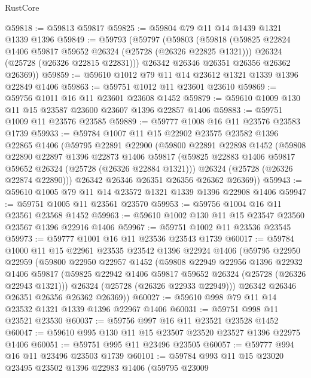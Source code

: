 \begin{lexlean}{RustCore}
\begin{coremodule}
@59818 := @59813 @59817
@59825 := @59804 @79 @11 @14 @1439 @1321 @1339 @1396
@59849 := @59793
    (@59797
      (@59803
        (@59818
          (@59825 @22824 @1406 @59817 @59652 @26324 (@25728 (@26326 @22825 @1321)))
          @26324
          (@25728 (@26326 @22815 @22831)))
        @26342
        @26346
        @26351
        @26356
        @26362
        @26369))
@59859 := @59610 @1012 @79 @11 @14 @23612 @1321 @1339 @1396 @22849 @1406
@59863 := @59751 @1012 @11 @23601 @23610
@59869 := @59756 @1011 @16 @11 @23601 @23608 @1452
@59879 := @59610 @1009 @130 @11 @15 @23587 @23600 @23607 @1396 @22857 @1406
@59883 := @59751 @1009 @11 @23576 @23585
@59889 := @59777 @1008 @16 @11 @23576 @23583 @1739
@59933 := @59784
    @1007
    @11
    @15
    @22902
    @23575
    @23582
    @1396
    @22865
    @1406
    (@59795
      @22891
      @22900
      (@59800
        @22891
        @22898
        @1452
        (@59808
          @22890
          @22897
          @1396
          @22873
          @1406
          @59817
          (@59825 @22883 @1406 @59817 @59652 @26324 (@25728 (@26326 @22884 @1321)))
          @26324
          (@25728 (@26326 @22874 @22890)))
        @26342
        @26346
        @26351
        @26356
        @26362
        @26369))
@59943 := @59610 @1005 @79 @11 @14 @23572 @1321 @1339 @1396 @22908 @1406
@59947 := @59751 @1005 @11 @23561 @23570
@59953 := @59756 @1004 @16 @11 @23561 @23568 @1452
@59963 := @59610 @1002 @130 @11 @15 @23547 @23560 @23567 @1396 @22916 @1406
@59967 := @59751 @1002 @11 @23536 @23545
@59973 := @59777 @1001 @16 @11 @23536 @23543 @1739
@60017 := @59784
    @1000
    @11
    @15
    @22961
    @23535
    @23542
    @1396
    @22924
    @1406
    (@59795
      @22950
      @22959
      (@59800
        @22950
        @22957
        @1452
        (@59808
          @22949
          @22956
          @1396
          @22932
          @1406
          @59817
          (@59825 @22942 @1406 @59817 @59652 @26324 (@25728 (@26326 @22943 @1321)))
          @26324
          (@25728 (@26326 @22933 @22949)))
        @26342
        @26346
        @26351
        @26356
        @26362
        @26369))
@60027 := @59610 @998 @79 @11 @14 @23532 @1321 @1339 @1396 @22967 @1406
@60031 := @59751 @998 @11 @23521 @23530
@60037 := @59756 @997 @16 @11 @23521 @23528 @1452
@60047 := @59610 @995 @130 @11 @15 @23507 @23520 @23527 @1396 @22975 @1406
@60051 := @59751 @995 @11 @23496 @23505
@60057 := @59777 @994 @16 @11 @23496 @23503 @1739
@60101 := @59784
    @993
    @11
    @15
    @23020
    @23495
    @23502
    @1396
    @22983
    @1406
    (@59795
      @23009

\end{coremodule}
\end{lexlean}
